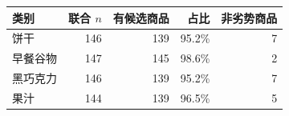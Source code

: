 \begin{tabular}{lrrrr}
\toprule
类别 & 联合 $n$ & 有候选商品 & 占比 & 非劣势商品 \\
\midrule
饼干 & 146 & 139 & 95.2\% & 7 \\
早餐谷物 & 147 & 145 & 98.6\% & 2 \\
黑巧克力 & 146 & 139 & 95.2\% & 7 \\
果汁 & 144 & 139 & 96.5\% & 5 \\
\bottomrule
\end{tabular}
